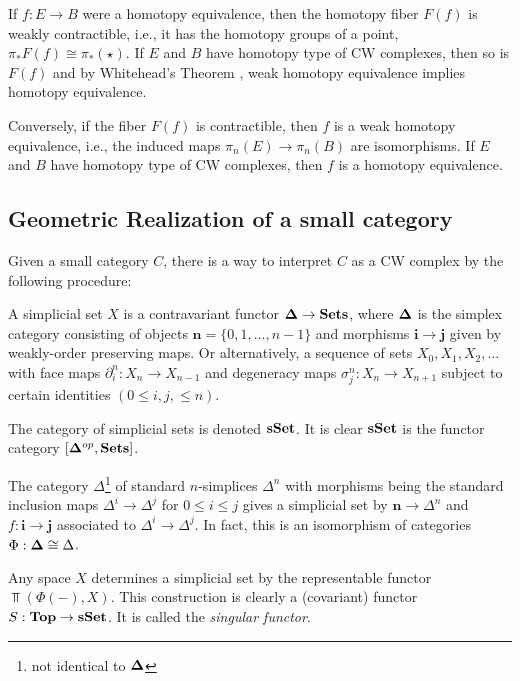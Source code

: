 If $f : E \to B$ were a homotopy equivalence, then the homotopy fiber $F(f)$ is weakly contractible, i.e.,
it has the homotopy groups of a point, $\pi_*F(f) \cong \pi_*(\star)$.
If $E$ and $B$ have homotopy type of CW complexes, then so is $F(f)$ and by Whitehead's Theorem \cite{Whitehead}, weak homotopy equivalence implies homotopy equivalence.

Conversely, if the fiber $F(f)$ is contractible, then $f$ is a weak homotopy equivalence, i.e., the induced maps $\pi_n(E) \to \pi_n(B)$ are isomorphisms.
If $E$ and $B$ have homotopy type of CW complexes, then $f$ is a homotopy equivalence.


\subsection{Geometric Realization of a small category}
Given a small category $C$, there is a way to interpret $C$ as a CW complex by the following procedure:

\begin{definition}
A simplicial set $X$ is a contravariant functor $\mathbf{\Delta} \to \mathbf{Sets}$, where $\mathbf{\Delta}$ is the simplex
category consisting of objects $\mathbf n = \{0,1, \ldots, n-1\}$ and morphisms $\mathbf i \to \mathbf j$ given by weakly-order preserving maps.
Or alternatively, a sequence of sets $X_0, X_1, X_2, \ldots$ with face maps $\partial^n_i : X_n \to X_{n-1}$ and degeneracy maps $\sigma^n_j : X_n \to X_{n+1}$ subject to certain identities $(0 \leq i,j, \leq n)$.
\end{definition}
The category of simplicial sets is denoted $\mathbf{sSet}$. It is clear $\mathbf{sSet}$ is the functor category $[\mathbf{\Delta}^{\mathord{op}}, \mathbf{Sets}]$.

\begin{example}
The category $\Delta$\footnote{not identical to $\mathbf{\Delta}$} of standard $n$-simplices $\Delta^n$ with morphisms being the standard inclusion maps $\Delta^i \to \Delta^j$ for $0 \leq i \leq j$
gives a simplicial set by $\mathbf n \to \Delta^n$ and $f : \mathbf i \to \mathbf j$ associated to $\Delta^i \to \Delta^j$.
In fact, this is an isomorphism of categories $\Phi : \mathbf{\Delta} \cong \Delta$.
\end{example}

\begin{example}
Any space $X$ determines a simplicial set by the representable functor $\Top(\Phi(-),X)$.
This construction is clearly a (covariant) functor $S : \mathbf{Top} \to \mathbf{sSet}$. It is called the \emph{singular functor}.
\end{example}

